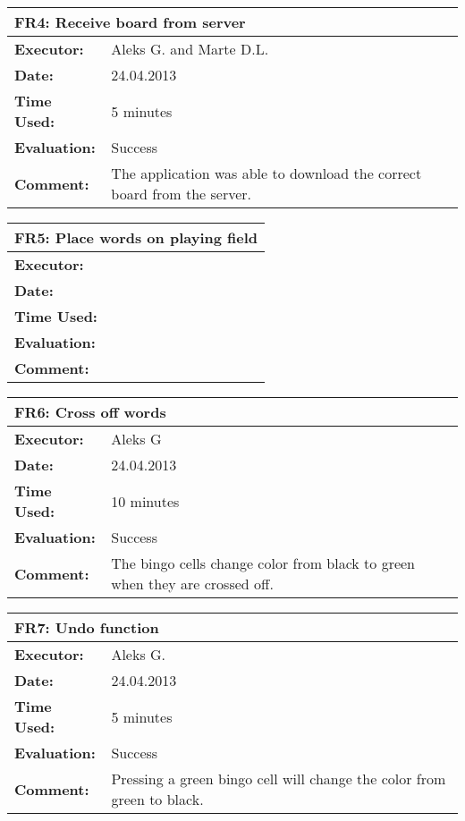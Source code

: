 \begin{tabular}{|m{}||m{}|}
\hline
\multicolumn{2}{|l|}{FR4: Receive board from server} \\ \hline
\textbf{Executor:} & Aleks G. and Marte D.L.\\ \hline
\textbf{Date:} & 24.04.2013\\ \hline
\textbf{Time Used:} & 5 minutes\\ \hline
\textbf{Evaluation:} & Success\\ \hline
\textbf{Comment:} & The application was able to download the correct board from the server.\\ \hline
\end{tabular}

\begin{tabular}{|m{}||m{}|}
\hline
\multicolumn{2}{|l|}{FR5: Place words on playing field} \\ \hline
\textbf{Executor:} & \\ \hline
\textbf{Date:} & \\ \hline
\textbf{Time Used:} & \\ \hline
\textbf{Evaluation:} & \\ \hline
\textbf{Comment:} & \\ \hline
\end{tabular}

\begin{tabular}{|m{}||m{}|}
\hline
\multicolumn{2}{|l|}{FR6: Cross off words} \\ \hline
\textbf{Executor:} & Aleks G\\ \hline
\textbf{Date:} & 24.04.2013\\ \hline
\textbf{Time Used:} & 10 minutes\\ \hline
\textbf{Evaluation:} & Success\\ \hline
\textbf{Comment:} & The bingo cells change color from black to green when they are crossed off. \\ \hline
\end{tabular}

\begin{tabular}{|m{}||m{}|}
\hline
\multicolumn{2}{|l|}{FR7: Undo function} \\ \hline
\textbf{Executor:} & Aleks G.\\ \hline
\textbf{Date:} & 24.04.2013\\ \hline
\textbf{Time Used:} & 5 minutes \\ \hline
\textbf{Evaluation:} & Success\\ \hline
\textbf{Comment:} & Pressing a green bingo cell will change the color from green to black.\\ \hline
\end{tabular}

